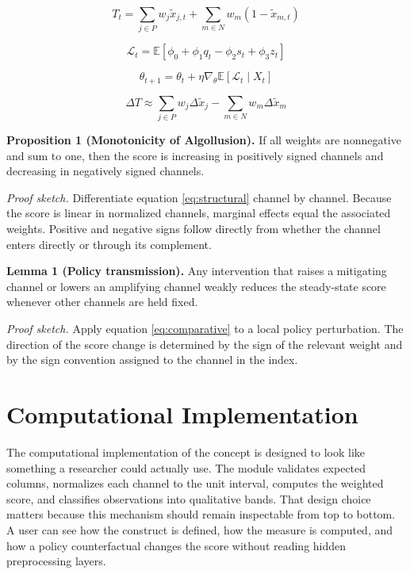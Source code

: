\documentclass[12pt]{article}
\begin{document}
\begin{equation}
T_t = \sum_{j \in P} w_j \tilde{x}_{j,t} + \sum_{m \in N} w_m (1 - \tilde{x}_{m,t})
\label{eq:structural}
\end{equation}

\begin{equation}
\mathcal{L}_t = \mathbb{E}\left[\phi_0 + \phi_1 q_t - \phi_2 s_t + \phi_3 z_t\right]
\label{eq:loss}
\end{equation}

\begin{equation}
\theta_{t+1} = \theta_t + \eta \nabla_\theta \mathbb{E}[\mathcal{L}_t \mid X_t]
\label{eq:update}
\end{equation}

\begin{equation}
\Delta T \approx \sum_{j \in P} w_j \Delta \tilde{x}_j - \sum_{m \in N} w_m \Delta \tilde{x}_m
\label{eq:comparative}
\end{equation}

\textbf{Proposition 1 (Monotonicity of Algollusion).} If all weights are nonnegative and sum to one, then the score is increasing in positively signed channels and decreasing in negatively signed channels.

\textit{Proof sketch.} Differentiate equation \eqref{eq:structural} channel by channel. Because the score is linear in normalized channels, marginal effects equal the associated weights. Positive and negative signs follow directly from whether the channel enters directly or through its complement.

\textbf{Lemma 1 (Policy transmission).} Any intervention that raises a mitigating channel or lowers an amplifying channel weakly reduces the steady-state score whenever other channels are held fixed.

\textit{Proof sketch.} Apply equation \eqref{eq:comparative} to a local policy perturbation. The direction of the score change is determined by the sign of the relevant weight and by the sign convention assigned to the channel in the index.

\section{Computational Implementation}
The computational implementation of the concept is designed to look like something a researcher could actually use. The module validates expected columns, normalizes each channel to the unit interval, computes the weighted score, and classifies observations into qualitative bands. That design choice matters because this mechanism should remain inspectable from top to bottom. A user can see how the construct is defined, how the measure is computed, and how a policy counterfactual changes the score without reading hidden preprocessing layers.
\end{document}
